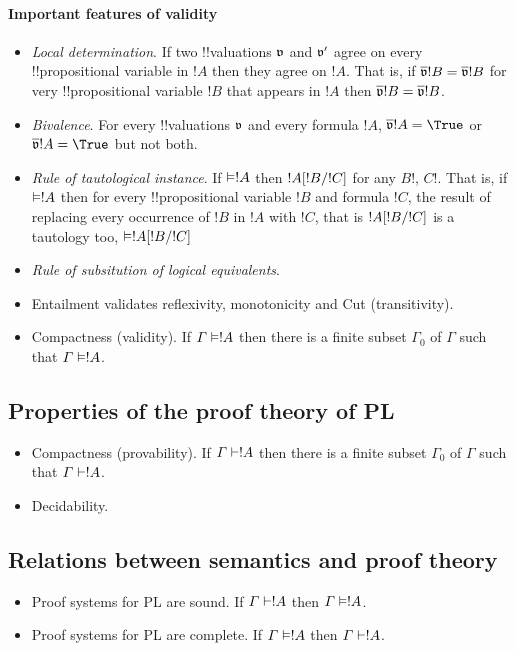 \documentclass[../../../include/open-logic-section]{subfiles}
\begin{document}
\paragraph*{Important features of validity}

\begin{itemize}
	\item \emph{Local determination}. If two !!{valuation}s $\pAssign{v}$ and $\pAssign{v'}$ agree on every !!{propositional variable} in $!A$ then they agree on $!A$. That is, if $\pValue{v}{!B}=\pValue{v}{!B}$ for very !!{propositional variable} $!B$ that appears in $!A$ then $\pValue{v}{!B}=\pValue{v}{!B}$.
	\item \emph{Bivalence}. For every !!{valuation}s $\pAssign{v}$ and every formula $!A$, $\pValue{v}{!A}=\True$ or $\pValue{v}{!A}=\True$ but not both.
	\item \emph{Rule of tautological instance}. If $\Entails !A$ then $!A[!B/!C]$ for any $B!$, $C!$. That is, if $\Entails !A$ then for every !!{propositional variable} $!B$ and formula $!C$, the result of replacing every occurrence of $!B$ in $!A$ with $!C$, that is $!A[!B/!C]$ is a tautology too, $\Entails \Subst{!A}{!B}{!C}$  
	\item \emph{Rule of subsitution of logical equivalents}.
	\item Entailment validates reflexivity, monotonicity and Cut (transitivity).
	\item Compactness (validity). If $\Gamma \Entails !A$ then there is a finite subset $\Gamma_0$ of $\Gamma$ such that $\Gamma \Entails !A$.
\end{itemize}

\subsection{Properties of the proof theory of PL}

\begin{itemize}
	\item Compactness (provability). If $\Gamma \Proves !A$ then there is a finite subset $\Gamma_0$ of $\Gamma$ such that $\Gamma \Proves !A$.
	\item Decidability.
\end{itemize}

\subsection{Relations between semantics and proof theory}

\begin{itemize}
	\item Proof systems for PL are sound. If $\Gamma \Proves !A$ then $\Gamma \Entails !A$.
	\item Proof systems for PL are complete. If $\Gamma \Entails !A$ then $\Gamma \Proves !A$.
\end{itemize}
\end{document}

